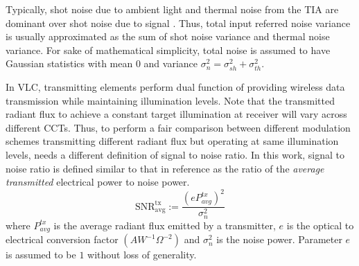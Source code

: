 Typically, shot noise due to ambient light and thermal noise from the TIA are dominant over shot noise due to signal \cite{kah97a}. Thus, total input referred noise variance is usually approximated as the sum of shot noise variance and thermal noise variance.  For sake of mathematical simplicity, total noise is assumed to have Gaussian statistics with mean $0$ and variance $\sigma_{n}^{2} = \sigma_{sh}^{2} + \sigma_{th}^{2}$.

In VLC, transmitting elements perform dual function of providing wireless data transmission while maintaining illumination levels. Note that the transmitted radiant flux to achieve a constant target illumination at receiver will vary across different CCTs. Thus, to perform a fair comparison between different modulation schemes transmitting different radiant flux but operating at same illumination levels, needs a different definition of signal to noise ratio. In this work, signal to noise ratio is defined similar to that in reference \cite{fat13a} as the ratio of the \textit{average transmitted} electrical power to noise power. 
\begin{equation}
	\label{eqSNR}
	\text{SNR}^{\text{tx}}_{\text{avg}} := \frac{(eP_{avg}^{tx})^2}{\sigma_n^{2}}
\end{equation}
where $P_{avg}^{tx}$ is the average radiant flux emitted by a transmitter, $e$ is the optical to electrical conversion factor $(AW^{-1}\Omega^{-2})$ and $\sigma_n^{2}$ is the noise power. Parameter $e$ is assumed to be $1$ without loss of generality.